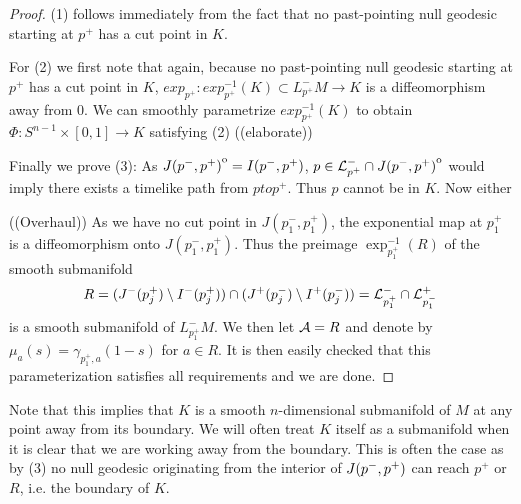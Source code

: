 \begin{proof}
(1) follows immediately from the fact that no past-pointing null geodesic starting at $p^+$ has a cut point in $K$.

For (2) we first note that again, because no past-pointing null geodesic starting at $p^+$ has a cut point in $K$, $exp_{p^+}:exp_{p^+}^{-1}(K)\subset L^-_{p^+}M\to K$ is a diffeomorphism away from $0$. We can smoothly parametrize $exp_{p^+}^{-1}(K)$ to obtain $\Phi:S^{n-1}\times[0,1]\to K$ satisfying (2) ((elaborate))

Finally we prove (3): As ${\kern0ptJ(p^-,p^+)}^{\mathrm{o}} = I(p^-,p^+)$, $p\in \mathcal{L}^-_{p^+}\cap {\kern0ptJ(p^-,p^+)}^{\mathrm{o}}$ would imply there exists a timelike path from $p to p^+$. Thus $p$ cannot be in $K$. Now either 

((Overhaul))
As we have no cut point in $J(p_1^-,p_1^+)$, the exponential map at $p_1^+$ is a diffeomorphism onto $J(p_1^-,p_1^+)$. Thus the preimage $\exp^{-1}_{p_1^+}(R)$ of the smooth submanifold
\[
    R = (J^-(p_j^+)\setminus I^-(p_j^+)) \cap (J^+(p_j^-)\setminus I^+(p_j^-)) = \mathcal{L}^-_{p_1^+} \cap \mathcal{L}^+_{p_1^-}
\]
is a smooth submanifold of $L^-_{p^+_1}M$. We then let $\mathcal{A}=R$ and denote by $\mu_a(s) = \gamma_{p_1^+,a}(1-s)$ for $a\in R$. It is then easily checked that this parameterization satisfies all requirements and we are done.
\end{proof}

Note that this implies that $K$ is a smooth $n$-dimensional submanifold of $M$ at any point away from its boundary. We will often treat $K$ itself as a submanifold when it is clear that we are working away from the boundary. This is often the case as by (3) no null geodesic originating from the interior of $J(p^-,p^+)$ can reach $p^+$ or $R$, i.e. the boundary of $K$.


